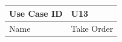 \documentclass[12pt]{article}
\begin{document}
\begin{table}[H]
\begin{tabular}{|l|l|}
\hline
Use Case ID & U13                                                                                                                                                                                                                                                                                                                                                                                                                                                                                                                                                                                                                                                                                                                                                                                                                                                                                                                                                                                                                                                                               \\ \hline
Name        & Take Order                                                                                                                                                                                                                                                                                                                                                                                                                                                                                                                                                                                                                                                                                                                                                                                                                                                                                                                                                                                                                                                                        \\ \hline

\end{tabular}
\end{table}
\end{document}
